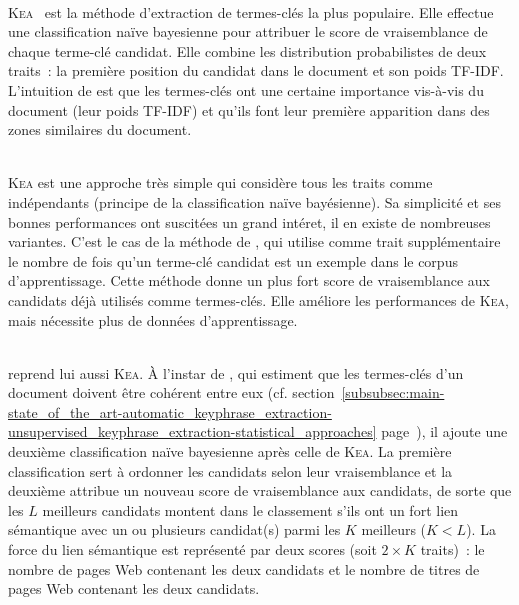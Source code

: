         ~\\\textsc{Kea}~\cite{witten1999kea} est la méthode d'extraction de
        termes-clés la plus populaire. Elle effectue une classification naïve
        bayesienne pour attribuer le score de vraisemblance de chaque terme-clé
        candidat. Elle combine les distribution probabilistes de deux traits~:
        la première position du candidat dans le document et son poids TF-IDF.
        L'intuition de  est que les termes-clés ont une
        certaine importance vis-à-vis du document (leur poids TF-IDF) et qu'ils
        font leur première apparition dans des zones similaires du document.

        ~\\\textsc{Kea} est une approche très simple qui considère tous les
        traits comme indépendants (principe de la classification naïve
        bayésienne). Sa simplicité et ses bonnes performances ont suscitées un
        grand intéret, il en existe de nombreuses variantes. C'est le cas de la
        méthode de , qui utilise comme trait
        supplémentaire le nombre de fois qu'un terme-clé candidat est un exemple
        dans le corpus d'apprentissage. Cette méthode donne un plus fort score
        de vraisemblance aux candidats déjà utilisés comme termes-clés. Elle
        améliore les performances de \textsc{Kea}, mais nécessite plus de
        données d'apprentissage.
        
        ~\\ reprend lui aussi \textsc{Kea}. À
        l'instar de , qui estiment que
        les termes-clés d'un document doivent être cohérent entre eux (cf.
        section~\ref{subsubsec:main-state_of_the_art-automatic_keyphrase_extraction-unsupervised_keyphrase_extraction-statistical_approaches}
        page~\pageref{subsubsec:main-state_of_the_art-automatic_keyphrase_extraction-unsupervised_keyphrase_extraction-statistical_approaches:ilp}),
        il ajoute une deuxième classification naïve bayesienne après celle de
        \textsc{Kea}. La première classification sert à ordonner les candidats
        selon leur vraisemblance et la deuxième attribue un nouveau score de
        vraisemblance aux candidats, de sorte que les $L$ meilleurs candidats
        montent dans le classement s'ils ont un fort lien sémantique avec un ou
        plusieurs candidat(s) parmi les $K$ meilleurs ($K < L$). La force du
        lien sémantique est représenté par deux scores (soit $2 \times K$
        traits)~: le nombre de pages Web contenant les deux candidats et le
        nombre de titres de pages Web contenant les deux candidats.

